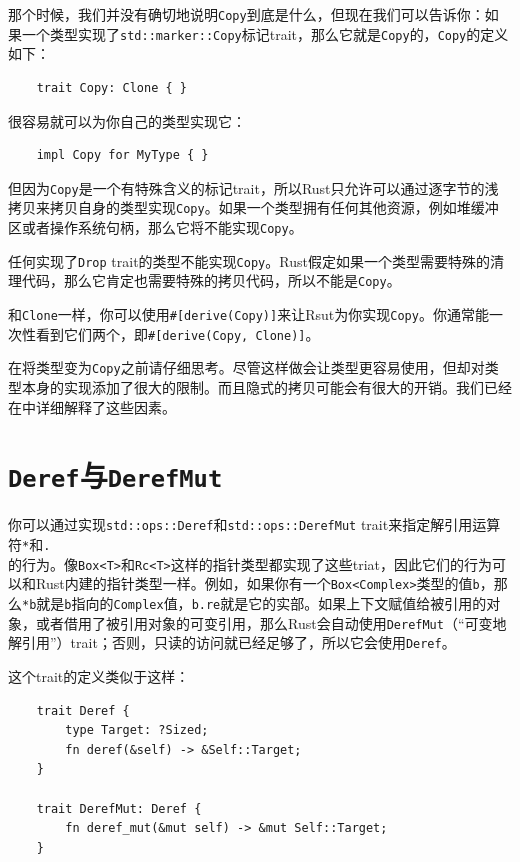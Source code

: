 那个时候，我们并没有确切地说明\texttt{Copy}到底是什么，但现在我们可以告诉你：如果一个类型实现了\texttt{std::marker::Copy}标记trait，那么它就是\texttt{Copy}的，\texttt{Copy}的定义如下：
\begin{verbatim}
    trait Copy: Clone { }
\end{verbatim}

很容易就可以为你自己的类型实现它：
\begin{verbatim}
    impl Copy for MyType { }
\end{verbatim}

但因为\texttt{Copy}是一个有特殊含义的标记trait，所以Rust只允许可以通过逐字节的浅拷贝来拷贝自身的类型实现\texttt{Copy}。如果一个类型拥有任何其他资源，例如堆缓冲区或者操作系统句柄，那么它将不能实现\texttt{Copy}。

任何实现了\texttt{Drop} trait的类型不能实现\texttt{Copy}。Rust假定如果一个类型需要特殊的清理代码，那么它肯定也需要特殊的拷贝代码，所以不能是\texttt{Copy}。

和\texttt{Clone}一样，你可以使用\texttt{\#[derive(Copy)]}来让Rsut为你实现\texttt{Copy}。你通常能一次性看到它们两个，即\texttt{\#[derive(Copy, Clone)]}。

在将类型变为\texttt{Copy}之前请仔细思考。尽管这样做会让类型更容易使用，但却对类型本身的实现添加了很大的限制。而且隐式的拷贝可能会有很大的开销。我们已经在中详细解释了这些因素。

\section{\texttt{Deref}与\texttt{DerefMut}}\label{deref}

你可以通过实现\texttt{std::ops::Deref}和\texttt{std::ops::DerefMut} trait来指定解引用运算符\texttt{*}和\texttt{.}\\
的行为。像\texttt{Box<T>}和\texttt{Rc<T>}这样的指针类型都实现了这些triat，因此它们的行为可以和Rust内建的指针类型一样。例如，如果你有一个\texttt{Box<Complex>}类型的值\texttt{b}，那么\texttt{*b}就是\texttt{b}指向的\texttt{Complex}值，\texttt{b.re}就是它的实部。如果上下文赋值给被引用的对象，或者借用了被引用对象的可变引用，那么Rust会自动使用\texttt{DerefMut}（“可变地解引用”）trait；否则，只读的访问就已经足够了，所以它会使用\texttt{Deref}。

这个trait的定义类似于这样：
\begin{verbatim}
    trait Deref {
        type Target: ?Sized;
        fn deref(&self) -> &Self::Target;
    }

    trait DerefMut: Deref {
        fn deref_mut(&mut self) -> &mut Self::Target;
    }
\end{verbatim}

